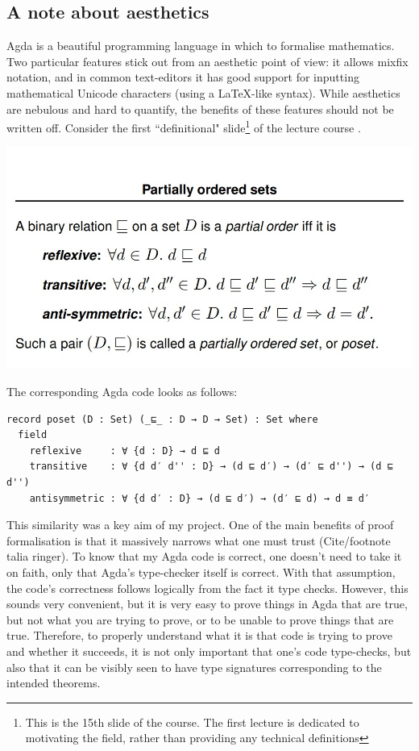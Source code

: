 \documentclass[12pt,a4paper,twoside,openright]{report}
\begin{document}
\subsection{A note about aesthetics}
Agda is a beautiful programming language in which to formalise mathematics. Two particular features stick out from an aesthetic point of view: it allows mixfix notation, and in common text-editors it has good support for inputting mathematical Unicode characters (using a \LaTeX-like syntax). While aesthetics are nebulous and hard to quantify, the benefits of these features should not be written off. Consider the first ``definitional" slide\footnote{This is the 15th slide of the course. The first lecture is dedicated to motivating the field, rather than providing any technical definitions} of the lecture course \cite{Course}.
\begin{center}
\includegraphics[scale = 0.7]{figs/poset_def}
\end{center}

The corresponding Agda code looks as follows:
\begin{verbatim}
record poset (D : Set) (_⊑_ : D → D → Set) : Set where
  field
    reflexive     : ∀ {d : D} → d ⊑ d 
    transitive    : ∀ {d d′ d'' : D} → (d ⊑ d′) → (d′ ⊑ d'') → (d ⊑ d'')
    antisymmetric : ∀ {d d′ : D} → (d ⊑ d′) → (d′ ⊑ d) → d ≡ d′
\end{verbatim}
This similarity was a key aim of my project. One of the main benefits of proof formalisation is that it massively narrows what one must trust (Cite/footnote talia ringer). To know that my Agda code is correct, one doesn't need to take it on faith, only that Agda's type-checker itself is correct. With that assumption, the code's correctness follows logically from the fact it type checks. However, this sounds very convenient, but it is very easy to prove things in Agda that are true, but not what you are trying to prove, or to be unable to prove things that are true. Therefore, to properly understand what it is that code is trying to prove and whether it succeeds, it is not only important that one's code type-checks, but also that it can be visibly seen to have type signatures corresponding to the intended theorems. 
\end{document}
